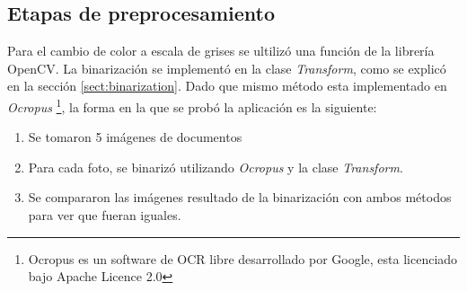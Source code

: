 \documentclass[a4paper, 11pt, oneside]{report}
\begin{document}
\subsection{Etapas de preprocesamiento}
Para el cambio de color a escala de grises se ultilizó una función de la librería OpenCV. La binarización se implementó en la clase {\it Transform}, como se explicó en la sección \ref{sect:binarization}. Dado que mismo método esta implementado en {\it Ocropus} \footnote{Ocropus es un software de OCR libre desarrollado por Google, esta licenciado bajo Apache Licence 2.0}, la forma en la que se probó la aplicación es la siguiente:
\begin{enumerate}
\item Se tomaron 5 imágenes de documentos
\item Para cada foto, se binarizó utilizando {\it Ocropus} y la clase {\it Transform}.
\item Se compararon las imágenes resultado de la binarización con ambos métodos para ver que fueran iguales.
\end{enumerate}
\end{document}
